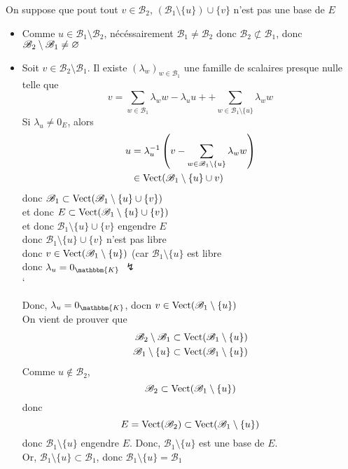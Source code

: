 \begin{prv}
	On suppose que pout tout $v \in \mathcal{B}_2$, $(\mathcal{B}_1\setminus \{u\}) \cup \{v\}$ n'est pas une base de $E$
	\begin{itemize}
		\item Comme $u \in \mathcal{B}_1 \setminus \mathcal{B}_2$, nécéssairement $\mathcal{B}_1 \neq \mathcal{B}_2$ donc $\mathcal{B}_2 \not\subset \mathcal{B}_1$, donc $\mathcal{B}_2\setminus\mathcal{B}_1 \neq \varnothing$ 
		\item Soit $v \in \mathcal{B}_2\setminus\mathcal{B}_1$. Il existe $(\lambda_w)_{w\in\mathcal{B}_1}$ une famille de scalaires presque nulle telle que \[
				v = \sum_{w \in \mathcal{B}_1} \lambda_w w - \lambda_u u + + \sum_{w \in \mathcal{B}_1\setminus \{u\}}\lambda_w w
			\]
			Si $\lambda_u \neq 0_E$, alors
			\begin{align*}
				u &= \lambda_u^{-1}\left( v - \sum_{w \in \mathcal{B}_1 \setminus \{u\}} \lambda_w w \right)\\
					&\in \operatorname{Vect}(\mathcal{B}_1\setminus \{u\} \cup v)
			\end{align*}
			 donc $\mathcal{B}_1 \subset \operatorname{Vect}(\mathcal{B}_1\setminus \{u\} \cup \{v\})$\\
			 et donc $E \subset  \operatorname{Vect}(\mathcal{B}_1 \setminus \{u\} \cup \{v\})$ \\
			 et donc $\mathcal{B}_1 \setminus \{u\} \cup \{v\}$ engendre $E$ \\
			 donc $\mathcal{B}_1 \setminus \{u\} \cup \{v\}$ n'est pas libre\\
			 donc $v \in \operatorname{Vect}(\mathcal{B}_1\setminus \{u\})$ (car $\mathcal{B}_1 \setminus \{u\}$ est libre\\
			 donc $\lambda_u = 0_\mathbbm{K}$ $\lightning$\\`

			 Donc, $\lambda_u = 0_\mathbbm{K}$, docn $v \in \operatorname{Vect}(\mathcal{B}_1\setminus \{u\})$ \\
			 On vient de prouver que
			 \begin{align*}
			 	\mathcal{B}_2 \setminus \mathcal{B}_1 \subset \operatorname{Vect}(\mathcal{B}_1 \setminus \{u\})\\
			 	\mathcal{B}_1 \setminus \{u\} \subset \operatorname{Vect}(\mathcal{B}_1 \setminus \{u\})\\
			 \end{align*}
			 Comme $u \not\in \mathcal{B}_2$, \[
			 	\mathcal{B}_2 \subset \operatorname{Vect}(\mathcal{B}_1 \setminus \{u\})
			 \] donc \[
			 	E = \operatorname{Vect}(\mathcal{B}_2) \subset  \operatorname{Vect}(\mathcal{B}_1 \setminus \{u\})
			 \] donc $\mathcal{B}_1 \setminus \{u\}$ engendre $E$. Donc,  $\mathcal{B}_1 \setminus \{u\}$ est une base de $E$.\\
			 Or, $\mathcal{B}_1 \setminus \{u\} \subset  \mathcal{B}_1$, donc $\mathcal{B}_1 \setminus \{u\} = \mathcal{B}_1$
	\end{itemize}
\end{prv}

